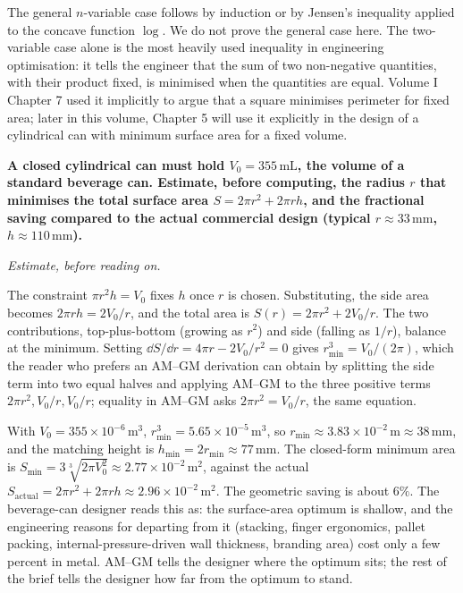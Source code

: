 The general $n$-variable case follows by induction or by Jensen's
inequality applied to the concave function $\log$. We do not prove
the general case here. The two-variable case alone is the most
heavily used inequality in engineering optimisation: it tells the
engineer that the sum of two non-negative quantities, with their
product fixed, is minimised when the quantities are equal. Volume I
Chapter 7 used it implicitly to argue that a square minimises
perimeter for fixed area; later in this volume, Chapter 5 will use
it explicitly in the design of a cylindrical can with minimum
surface area for a fixed volume.

\begin{estimation}
\textbf{A closed cylindrical can must hold $V_{0} = 355
\,\si{\milli\liter}$, the volume of a standard beverage can.
Estimate, before computing, the radius $r$ that minimises the
total surface area $S = 2 \pi r^{2} + 2 \pi r h$, and the
fractional saving compared to the actual commercial design (typical
$r \approx 33 \,\si{\milli\meter}$, $h \approx 110 \,\si{\milli\meter}$).}

\smallskip
\textit{Estimate, before reading on.}

\smallskip
The constraint $\pi r^{2} h = V_{0}$ fixes $h$ once $r$ is chosen.
Substituting, the side area becomes $2 \pi r h = 2 V_{0} / r$, and
the total area is $S(r) = 2 \pi r^{2} + 2 V_{0} / r$. The two
contributions, top-plus-bottom (growing as $r^{2}$) and side (falling
as $1/r$), balance at the minimum. Setting $\dd S / \dd r = 4 \pi r
- 2 V_{0} / r^{2} = 0$ gives $r_{\min}^{3} = V_{0} / (2 \pi)$,
which the reader who prefers an AM--GM derivation can obtain by
splitting the side term into two equal halves and applying AM--GM
to the three positive terms $2 \pi r^{2}, V_{0}/r, V_{0}/r$; equality
in AM--GM asks $2 \pi r^{2} = V_{0}/r$, the same equation.

With $V_{0} = 355 \times 10^{-6} \,\si{\meter\cubed}$, $r_{\min}^{3}
= 5.65 \times 10^{-5} \,\si{\meter\cubed}$, so $r_{\min} \approx
3.83 \times 10^{-2} \,\si{\meter} \approx 38 \,\si{\milli\meter}$,
and the matching height is $h_{\min} = 2 r_{\min} \approx 77 \,\si
{\milli\meter}$. The closed-form minimum area is $S_{\min} = 3
\sqrt[3]{2 \pi V_{0}^{2}} \approx 2.77 \times 10^{-2}
\,\si{\meter\squared}$, against the actual $S_{\text{actual}} =
2 \pi r^{2} + 2 \pi r h \approx 2.96 \times 10^{-2} \,\si{\meter
\squared}$. The geometric saving is about $6 \%$. The beverage-can
designer reads this as: the surface-area optimum is shallow, and
the engineering reasons for departing from it (stacking, finger
ergonomics, pallet packing, internal-pressure-driven wall thickness,
branding area) cost only a few percent in metal. AM--GM tells the
designer where the optimum sits; the rest of the brief tells the
designer how far from the optimum to stand.
\end{estimation}

